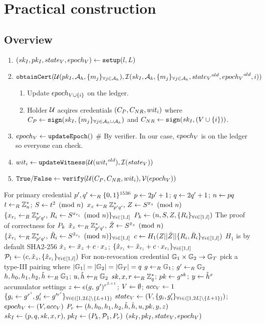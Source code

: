 \documentclass{article}
\begin{document}
\section{Practical construction}
\subsection{Overview}
\begin{enumerate}
	\item $\setupp\la \setupi$
	\item $\mt{obtainCert}(\mc{U}(pk_I, \ah, \group{m_{j}}{j}{\ah }), \mc{I}(\ski, \ak, \group{m_{j}}{j}{\ak }, \old{\stv }, \old{\epv },i))$
	\begin{enumerate}
		\item Update $\ep{\vi } $ on the ledger.
		\item Holder $\mc{U}$ acqires credentials $(C_{P}, C_{NR}, \witi )$ where $C_{P}\la \mt{sign}(\ski, \group{m_{j}}{j}{\ahk })$ and $C_{NR}\la \mt{sign}(\ski, (\vi ))$.
	\end{enumerate}
	\item $\epv \la \mt{updateEpoch}()$ \# By verifier. In our case, $\epv $ is on the ledger so everyone can check.
	\item $\witi \la \mt{updateWitness}(\mc{U}(\old{\witi }), \mc{I}(\stv ))$
	\item $\true /\false \la \mt{verify}(\mc{U}(C_{P}, C_{NR}, \witi ), \mc{V}(\epv))$
\end{enumerate}

\begin{algorithm}
\caption{$\setupi$}
\label{alg:setup}
\begin{algorithmic}
	\State \Comment For primary credential
	\State $p',q'\lar \binbits{1536}$
	\State $p\la 2p'+1$; $q\la 2q'+1$; $n\la pq$
	\State $t\lar \mbz{n}$; $\equivmod{S}{t^2}{n}$
	\State $\randexpm{x_{z}}{p'q'}{Z}{S}{n}$
	\State $\group{\randexpm{x_{r_i}}{p'q'}{R_{i}}{S}{n}}{i}{\rgpl }$
	\State $\pk \la \pkp $
	\State \Comment The proof of correctness for $\pk $
	\State $\randexpm{\td{x}_{z}}{p'q'}{\td{Z}}{S}{n}$
	\State $\group{\randexpm{\td{x}_{r_i}}{p'q'}{\td{R}_{i}}{S}{n}}{i}{\rgpl }$
	\State $c\la H_{1}(Z||\td{Z}||\group{R_i,\td{R}_i}{i}{\rgpl })$
	\Comment $H_1$ is by default SHA2-256
	\State $\zkp{x}{z}$; $\group{\zkp{x}{r_{i}}}{i}{\rgpl }$
	\State $\pl \la \plp$
	\State \Comment For non-revocation credential
	\State $\mbg{1}\times \mbg{2} \rightarrow \mbg{T}$
	\Comment pick a type-III pairing where $|\mbg{1}|=|\mbg{2}|=|\mbg{T}|=q$
	\State $g\lar \mbg{1}$; $g'\lar \mbg{2}$
	\State $h, h_0, h_1, h_2, \td{h}\lar \mbg{1}$; $u, \hat{h}\lar \mbg{2}$
	\State $sk, x, r \lar \mbz{q} $; $pk \la g^{sk}$; $y \la \hat{h}^{x}$
	\State \Comment accumulator settings
	\State $z\la \pairingexp{g}{g'}{r^{L + 1}}$; $V\la \emptyset$; $\accv \la 1$
	\State $\group{g_i\la g^{r^{i}}, g'_i\la g'^{r^{i}}}{i}{\rgptlml}$
	\State $\stv \la \stp $; $\epv \la \epp $
	\State $\pr \la \prp $
	\State $\keypairv{I}{(p, q, sk, x, r)}{\pkip }$
	\State \Return $\setupp $
\end{algorithmic}
\end{algorithm}
\end{document}
